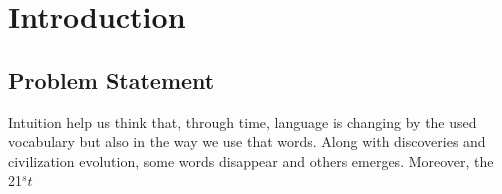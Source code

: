 \section{Introduction}

\subsection{Problem Statement}
Intuition help us think that, through time, language is changing by the used vocabulary but also in the way we use that words.
Along with discoveries and civilization evolution, some words disappear and others emerges. Moreover, the 21$^st$ 

